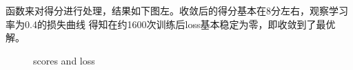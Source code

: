 \documentclass{article}
\begin{document}
\begin{CJK}{UTF8}{gbsn}
函数来对得分进行处理，结果如下图左。收敛后的得分基本在8分左右，观察学习率为0.4的损失曲线
得知在约1600次训练后loss基本稳定为零，即收敛到了最优解。
\begin{figure}[htbp]
  \centering
  \caption{scores and loss}
\end{figure} 


\end{CJK}
\end{document}
